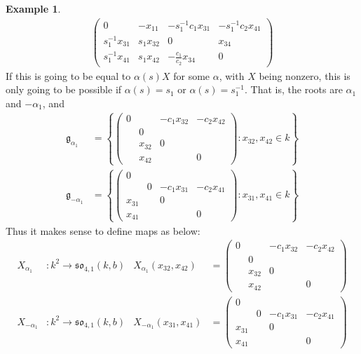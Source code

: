 \documentclass[12pt]{article}
\theoremstyle{definition}
\newtheorem{example}[theorem]{Example}
\newcommand{\lb}{\left\{}
\newcommand{\rb}{\right\}}
\newcommand{\inv}{^{-1}}
\newcommand{\frakg}{\mathfrak{g}}
\newcommand{\frakso}{\mathfrak{so}}
\begin{document}
\begin{example}
\begin{align*}
\begin{pmatrix}
		0 & - x_{11} & - s_1 \inv c_1 x_{31} & - s_1 \inv c_2 x_{41} \\
		s_1 \inv x_{31} & s_1 x_{32} & 0 & x_{34} \\
		s_1 \inv x_{41} & s_1 x_{42} & - \frac{c_1}{c_2} x_{34} & 0
	\end{pmatrix}
\end{align*}
If this is going to be equal to $\alpha(s) X$ for some $\alpha$, with $X$ being nonzero, this is only going to be possible if $\alpha(s) = s_1$ or $\alpha(s) = s_1 \inv$. That is, the roots are $\alpha_1$ and $-\alpha_1$, and
\begin{align*}
	\frakg_{\alpha_1} &= \lb
	\begin{pmatrix}
		0 && - c_1 x_{32}  & - c_2 x_{42} \\
		& 0 &  \\
		& x_{32} & 0 &  \\
		& x_{42} && 0
	\end{pmatrix}: x_{32}, x_{42} \in k \rb \\
	\frakg_{-\alpha_1} &= 
	\lb
	\begin{pmatrix}
		0   \\
		& 0 & - c_1 x_{31} & - c_2 x_{41} \\
		x_{31} & & 0 & \\
		x_{41} & & & 0
	\end{pmatrix}
	: x_{31}, x_{41} \in k
	\rb
\end{align*}
Thus it makes sense to define maps as below:
\begin{align*}
	X_{\alpha_1}& :k^2 \to \frakso_{4,1}(k,b) & X_{\alpha_1}(x_{32}, x_{42}) &=
	\begin{pmatrix}
		0 && - c_1 x_{32}  & - c_2 x_{42} \\
		& 0 &  \\
		& x_{32} & 0 &  \\
		& x_{42} && 0
	\end{pmatrix} \\
	X_{-\alpha_1}&:k^2 \to \frakso_{4,1}(k,b) & X_{-\alpha_1}(x_{31}, x_{41}) &=
	\begin{pmatrix}
		0   \\
		& 0 & - c_1 x_{31} & - c_2 x_{41} \\
		x_{31} & & 0 & \\
		x_{41} & & & 0
	\end{pmatrix}
\end{align*}
\end{example}
\end{document}
